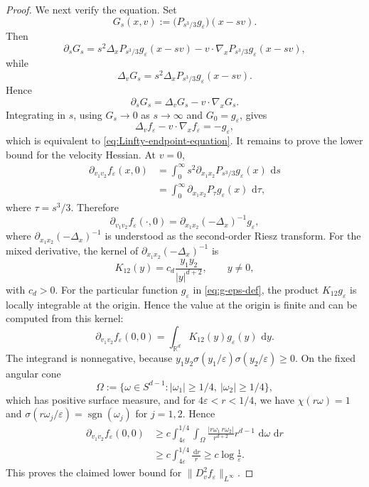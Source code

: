 \documentclass[11pt,reqno]{amsart}
\numberwithin{equation}{section}
\theoremstyle{remark}
\newcommand{\R}{\mathbb{R}}
\newcommand{\dd}{\,\mathrm{d}}
\begin{document}
\begin{proof}
We next verify the equation.  Set
\[
   G_s(x,v):=\big(P_{s^3/3}g_\varepsilon\big)(x-sv).
\]
Then
\[
   \partial_sG_s
   =s^2\Delta_x P_{s^3/3}g_\varepsilon(x-sv)
    -v\cdot\nabla_x P_{s^3/3}g_\varepsilon(x-sv),
\]
while
\[
   \Delta_vG_s
   =s^2\Delta_x P_{s^3/3}g_\varepsilon(x-sv).
\]
Hence
\[
   \partial_sG_s=\Delta_vG_s-v\cdot\nabla_xG_s.
\]
Integrating in \(s\), using \(G_s\to0\) as \(s\to\infty\) and
\(G_0=g_\varepsilon\), gives
\[
   \Delta_vf_\varepsilon-v\cdot\nabla_xf_\varepsilon=-g_\varepsilon,
\]
which is equivalent to \eqref{eq:Linfty-endpoint-equation}. It remains to prove the lower bound for the velocity Hessian.  At \(v=0\),
\[
\begin{aligned}
   \partial_{v_1v_2}f_\varepsilon(x,0)
   &=\int_0^\infty
      s^2\partial_{x_1x_2}P_{s^3/3}g_\varepsilon(x)\,\dd s  \\
   &=\int_0^\infty
      \partial_{x_1x_2}P_\tau g_\varepsilon(x)\,\dd\tau,
\end{aligned}
\]
where \(\tau=s^3/3\).  Therefore
\begin{equation}\label{eq:riesz-identity}
   \partial_{v_1v_2}f_\varepsilon(\cdot,0)
   =\partial_{x_1x_2}(-\Delta_x)^{-1}g_\varepsilon,
\end{equation}
where \(\partial_{x_1x_2}(-\Delta_x)^{-1}\) is understood as the
second-order Riesz transform.  For the mixed derivative, the kernel of
\(\partial_{x_1x_2}(-\Delta_x)^{-1}\) is
\begin{equation}\label{eq:riesz-kernel}
   K_{12}(y)=c_d\frac{y_1y_2}{|y|^{d+2}},
   \qquad y\ne0,
\end{equation}
with \(c_d>0\).  For the particular function \(g_\varepsilon\) in
\eqref{eq:g-eps-def}, the product \(K_{12}g_\varepsilon\) is locally
integrable at the origin.  Hence the value at the origin is finite and
can be computed from this kernel:
\[
   \partial_{v_1v_2}f_\varepsilon(0,0)
   =\int_{\R^d}K_{12}(y)g_\varepsilon(y)\,\dd y.
\]
The integrand is nonnegative, because
\(y_1y_2\sigma(y_1/\varepsilon)\sigma(y_2/\varepsilon)\ge0\).  On the fixed
angular cone
\[
   \Omega:=\{\omega\in S^{d-1}: |\omega_1|\ge1/4,\ |\omega_2|\ge1/4\},
\]
which has positive surface measure, and for
\(4\varepsilon<r<1/4\), we have \(\chi(r\omega)=1\) and
\(\sigma(r\omega_j/\varepsilon)=\operatorname{sgn}(\omega_j)\) for
\(j=1,2\).  Hence
\[
\begin{aligned}
   \partial_{v_1v_2}f_\varepsilon(0,0)
   &\ge
   c\int_{4\varepsilon}^{1/4}\int_{\Omega}
      \frac{|r\omega_1\,r\omega_2|}{r^{d+2}}
      r^{d-1}\,\dd\omega\,\dd r  \\
   &\ge c\int_{4\varepsilon}^{1/4}\frac{\dd r}{r}
    \ge c\log\frac1\varepsilon.
\end{aligned}
\]
This proves the claimed lower bound for \(\|D_v^2f_\varepsilon\|_{L^\infty}\).
\end{proof}
\end{document}
